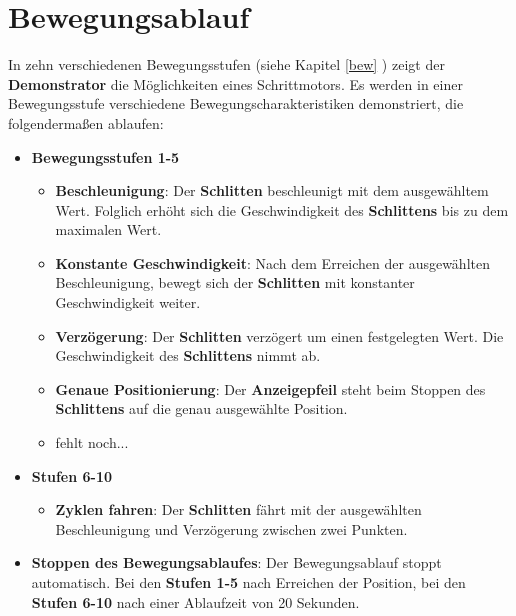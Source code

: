 
\chapter{Bewegungsablauf}

In zehn verschiedenen Bewegungsstufen (siehe Kapitel \ref{bew} ) zeigt der \textbf{Demonstrator} die Möglichkeiten eines Schrittmotors. Es werden in einer Bewegungsstufe verschiedene Bewegungscharakteristiken demonstriert, die folgendermaßen ablaufen:  

\begin{itemize}
	\item \textbf{Bewegungsstufen 1-5}
	\begin{itemize}
		\item\textbf{Beschleunigung}: Der \textbf{Schlitten} beschleunigt mit dem ausgewähltem Wert. Folglich erhöht sich die Geschwindigkeit des \textbf{Schlittens} bis zu dem maximalen Wert. 
		\item\textbf{Konstante Geschwindigkeit}: Nach dem Erreichen der ausgewählten Beschleunigung, bewegt sich der \textbf{Schlitten} mit konstanter Geschwindigkeit weiter.
		\item\textbf{Verzögerung}: Der \textbf{Schlitten} verzögert um einen festgelegten Wert. Die Geschwindigkeit des \textbf{Schlittens} nimmt ab.
		\item\textbf{Genaue Positionierung}: Der \textbf{Anzeigepfeil} steht beim Stoppen des \textbf{Schlittens} auf die genau ausgewählte Position.
		\item fehlt noch...
	\end{itemize}
\end{itemize}
\begin{itemize}	
	\item \textbf{Stufen 6-10}
	\begin{itemize}
		\item\textbf{Zyklen fahren}: Der \textbf{Schlitten} fährt mit der ausgewählten Beschleunigung und Verzögerung zwischen zwei Punkten.
	\end{itemize}			
\item \textbf{Stoppen des Bewegungsablaufes}: Der Bewegungsablauf stoppt automatisch. Bei den \textbf{Stufen 1-5} nach Erreichen der Position, bei den \textbf{ Stufen 6-10} nach einer Ablaufzeit von 20 Sekunden.
\end{itemize}
